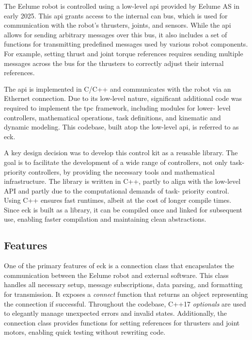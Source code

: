 The Eelume robot is controlled using a low-level \gls{api} provided by Eelume AS in 
early 2025. This \gls{api} grants access to the internal \gls{can} bus, which 
is used for communication with the robot's thrusters, joints, and sensors. 
While the \gls{api} allows for sending arbitrary messages over this bus, it 
also includes a set of functions for transmitting predefined messages used by 
various robot components. For example, setting thrust and joint torque 
references requires sending multiple messages across the bus for the thrusters 
to correctly adjust their internal references.

The \gls{api} is implemented in C/C++ and communicates with the robot via an 
Ethernet connection. Due to its low-level nature, significant additional code 
was required to implement the \gls{tpc} framework, including modules for lower-
level controllers, mathematical operations, task definitions, and kinematic 
and dynamic modeling. This codebase, built atop the low-level \gls{api}, is 
referred to as \gls{eck}.

A key design decision was to develop this control kit as a reusable library. 
The goal is to facilitate the development of a wide range of controllers, not 
only task-priority controllers, by providing the necessary tools and 
mathematical infrastructure. The library is written in C++, partly to align 
with the low-level API and partly due to the computational demands of task-
priority control. Using C++ ensures fast runtimes, albeit at the cost of 
longer compile times. Since \gls{eck} is built as a library, it can be 
compiled once and linked for subsequent use, enabling faster compilation and 
maintaining clean abstractions.

\subsection{Features}

One of the primary features of \gls{eck} is a connection class that 
encapsulates the communication between the Eelume robot and external software. 
This class handles all necessary setup, message subscriptions, data parsing, 
and formatting for transmission. It exposes a \textit{connect} function that 
returns an object representing the connection if successful. Throughout the 
codebase, C++17 \textit{optionals} are used to elegantly manage unexpected 
errors and invalid states. Additionally, the connection class provides 
functions for setting references for thrusters and joint motors, enabling 
quick testing without rewriting code.

